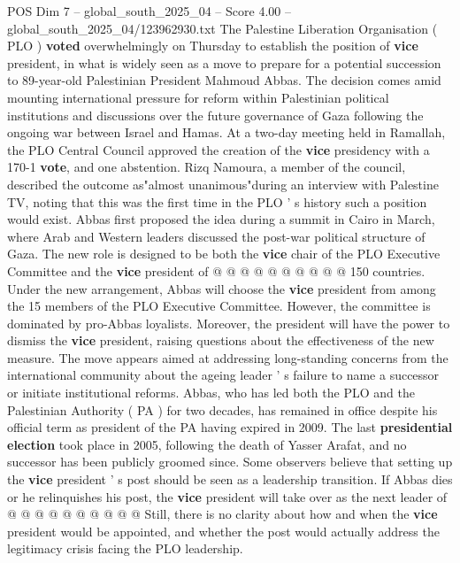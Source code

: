 \begin{textsample}{POS Dim 7 – global\_south\_2025\_04 – Score 4.00 – global\_south\_2025\_04/123962930.txt}  \label{ex:f7_pos_411}
The Palestine Liberation Organisation ( PLO ) \textbf{voted} overwhelmingly on Thursday to establish the position of \textbf{vice} president, in what is widely seen as a move to prepare for a potential succession to 89-year-old Palestinian President Mahmoud Abbas.
The decision comes amid mounting international pressure for reform within Palestinian political institutions and discussions over the future governance of Gaza following the ongoing war between Israel and Hamas.
At a two-day meeting held in Ramallah, the PLO Central Council approved the creation of the \textbf{vice} presidency with a 170-1 \textbf{vote}, and one abstention.
Rizq Namoura, a member of the council, described the outcome as"almost unanimous"during an interview with Palestine TV, noting that this was the first time in the PLO ' s history such a position would exist.
Abbas first proposed the idea during a summit in Cairo in March, where Arab and Western leaders discussed the post-war political structure of Gaza.
The new role is designed to be both the \textbf{vice} chair of the PLO Executive Committee and the \textbf{vice} president of @ @ @ @ @ @ @ @ @ @ 150 countries.
Under the new arrangement, Abbas will choose the \textbf{vice} president from among the 15 members of the PLO Executive Committee.
However, the committee is dominated by pro-Abbas loyalists.
Moreover, the president will have the power to dismiss the \textbf{vice} president, raising questions about the effectiveness of the new measure.
The move appears aimed at addressing long-standing concerns from the international community about the ageing leader ' s failure to name a successor or initiate institutional reforms.
Abbas, who has led both the PLO and the Palestinian Authority ( PA ) for two decades, has remained in office despite his official term as president of the PA having expired in 2009.
The last \textbf{presidential} \textbf{election} took place in 2005, following the death of Yasser Arafat, and no successor has been publicly groomed since.
Some observers believe that setting up the \textbf{vice} president ' s post should be seen as a leadership transition.
If Abbas dies or he relinquishes his post, the \textbf{vice} president will take over as the next leader of @ @ @ @ @ @ @ @ @ @ Still, there is no clarity about how and when the \textbf{vice} president would be appointed, and whether the post would actually address the legitimacy crisis facing the PLO leadership.

\end{textsample}
